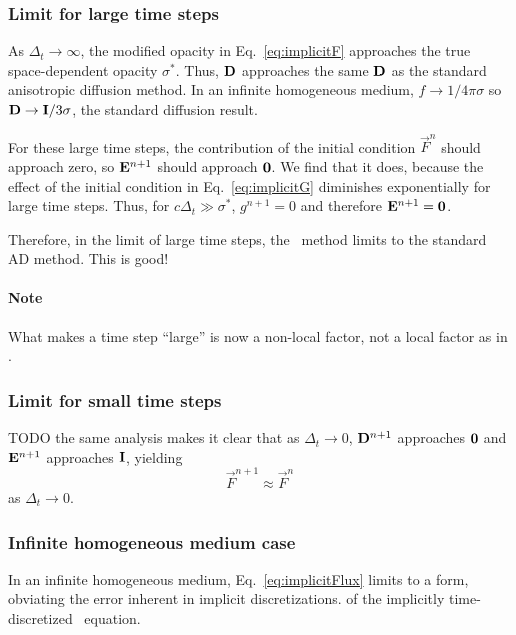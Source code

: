 \subsubsection{Limit for large time steps}
As $\Delta_t\to \infty$, the modified opacity in Eq.~\eqref{eq:implicitF}
approaches the true space-dependent opacity $\sigma^\ast$. Thus, $\mathbf{D}$
approaches the same $\mathbf{D}$ as the standard anisotropic diffusion method. In
an infinite homogeneous medium, $f\to 1/4\pi \sigma$ so $\mathbf{D} \to
\mathbf{I}/3\sigma$, the standard diffusion result.

For these large time steps, the contribution of the initial condition
$\vec{F}^n$ should approach zero, so $\mathbf{E}^{n+1}$ should approach $
\mathbf{0}$. We find that it does, because the effect of the initial condition
in Eq.~\eqref{eq:implicitG} diminishes exponentially for large time steps. Thus,
for $c \Delta_t \gg \sigma^\ast$, $g^{n+1}=0$ and therefore
$\mathbf{E}^{n+1}=\mathbf{0}$.

Therefore, in the limit of large time steps, the \APone\ method limits to the
standard AD method. This is good!

\paragraph{Note} What makes a time step ``large'' is now a non-local factor,
not a local factor as in \Pone.

\subsubsection{Limit for small time steps}
TODO the same analysis makes it clear that as $\Delta_t \to 0$,
$\mathbf{D}^{n+1}$ approaches $\mathbf{0}$ and $\mathbf{E}^{n+1}$ approaches $\mathbf{I}$,
yielding
\begin{equation*}
  \vec{F}^{n+1} \approx \vec{F}^{n}
\end{equation*}
as $\Delta_t \to 0$.

\subsubsection{Infinite homogeneous medium case}
In an infinite homogeneous medium, Eq.~\eqref{eq:implicitFlux} limits to a
form, obviating the error inherent in implicit discretizations.
of the implicitly time-discretized \Pone\ equation.

